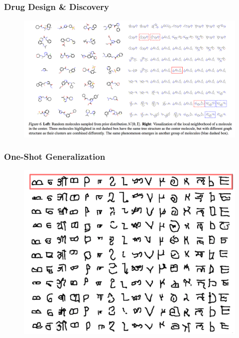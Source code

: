 \documentclass[10pt,mathserif]{beamer}
\begin{document}
\begin{frame}
  \frametitle{Drug Design & Discovery}
\begin{figure}[ht]
  \centering
  \includegraphics[width=0.6\paperwidth]{figure/vae_molecule}
  \caption{\label{fig:vae_molecule} }
\end{figure}
\end{frame}

\begin{frame}
  \frametitle{One-Shot Generalization}
\begin{figure}[ht]
  \centering
  \includegraphics[width=0.6\paperwidth]{figure/vae_omniglot}
  \caption{\label{fig:vae_omniglot} }
\end{figure}
\end{frame}
\end{document}
